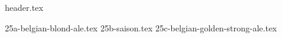 \clearpage
{}
\divisorLine

{header.tex}

\begin{multicols}{2}

{25a-belgian-blond-ale.tex}
{25b-saison.tex}
{25c-belgian-golden-strong-ale.tex}

\end{multicols}